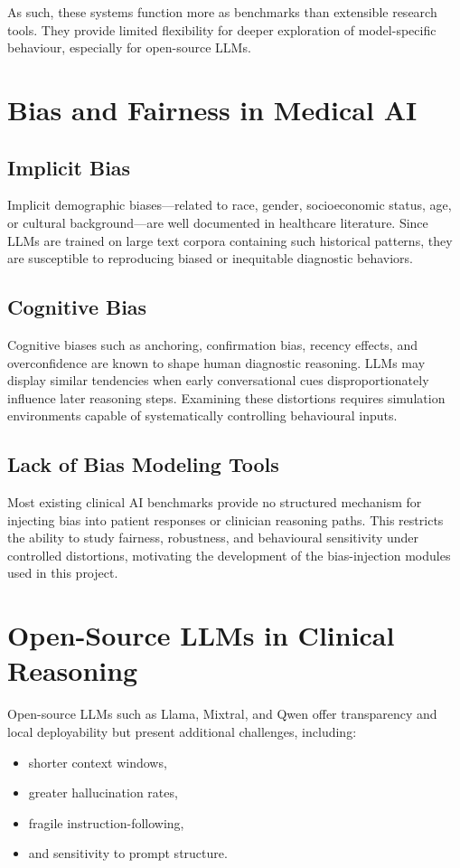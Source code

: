 As such, these systems function more as benchmarks than extensible research tools. They provide limited flexibility for deeper exploration of model-specific behaviour, especially for open-source LLMs.

\section{Bias and Fairness in Medical AI}

\subsection{Implicit Bias}

Implicit demographic biases—related to race, gender, socioeconomic status, age, or cultural background—are well documented in healthcare literature. Since LLMs are trained on large text corpora containing such historical patterns, they are susceptible to reproducing biased or inequitable diagnostic behaviors.

\subsection{Cognitive Bias}

Cognitive biases such as anchoring, confirmation bias, recency effects, and overconfidence are known to shape human diagnostic reasoning. LLMs may display similar tendencies when early conversational cues disproportionately influence later reasoning steps. Examining these distortions requires simulation environments capable of systematically controlling behavioural inputs.

\subsection{Lack of Bias Modeling Tools}

Most existing clinical AI benchmarks provide no structured mechanism for injecting bias into patient responses or clinician reasoning paths. This restricts the ability to study fairness, robustness, and behavioural sensitivity under controlled distortions, motivating the development of the bias-injection modules used in this project.

\section{Open-Source LLMs in Clinical Reasoning}

Open-source LLMs such as Llama, Mixtral, and Qwen offer transparency and local deployability but present additional challenges, including:
\begin{itemize}
    \item shorter context windows,  
    \item greater hallucination rates,  
    \item fragile instruction-following,  
    \item and sensitivity to prompt structure.
\end{itemize}

